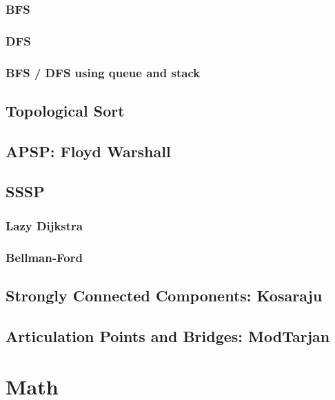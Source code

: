 \subsubsection{BFS}
\subsubsection{DFS}
\subsubsection{BFS / DFS using queue and stack}
\subsection{Topological Sort}
\subsection{APSP: Floyd Warshall}
\subsection{SSSP}
\subsubsection{Lazy Dijkstra}
\subsubsection{Bellman-Ford}
\subsection{Strongly Connected Components: Kosaraju}
\subsection{Articulation Points and Bridges: ModTarjan}

\section{Math}
